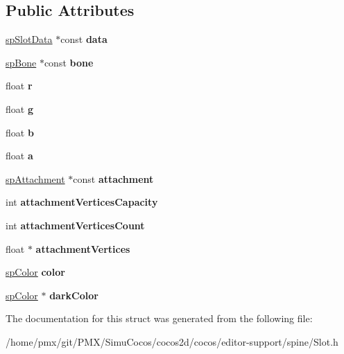 \subsection*{Public Attributes}
\begin{DoxyCompactItemize}
\item 
\mbox{\label{structspSlot_a535e1b2c5f0988647e600ce44c6211b9}} 
\hyperlink{structspSlotData}{sp\+Slot\+Data} $\ast$const {\bfseries data}
\item 
\mbox{\label{structspSlot_a215a15f5d2e0e6b8f91df8672afb0c2c}} 
\hyperlink{structspBone}{sp\+Bone} $\ast$const {\bfseries bone}
\item 
\mbox{\label{structspSlot_adf1bbeb82cf0c3834e3bc8c5fce1d698}} 
float {\bfseries r}
\item 
\mbox{\label{structspSlot_a80ec2bf7ada2d76407123c5ef0ac9dd4}} 
float {\bfseries g}
\item 
\mbox{\label{structspSlot_ab6b83663476fe2d9f7229b2036727960}} 
float {\bfseries b}
\item 
\mbox{\label{structspSlot_a5809a9fef07dc605ac2c2301167f7b0b}} 
float {\bfseries a}
\item 
\mbox{\label{structspSlot_a14e636bda0ea809807afeeb358b86213}} 
\hyperlink{structspAttachment}{sp\+Attachment} $\ast$const {\bfseries attachment}
\item 
\mbox{\label{structspSlot_a8885c0198f030d31723432fbabc73d28}} 
int {\bfseries attachment\+Vertices\+Capacity}
\item 
\mbox{\label{structspSlot_a8cf12728f84af0f3b7bcd07832293735}} 
int {\bfseries attachment\+Vertices\+Count}
\item 
\mbox{\label{structspSlot_afa891fb92218f35272148c7023dcf5f1}} 
float $\ast$ {\bfseries attachment\+Vertices}
\item 
\mbox{\label{structspSlot_a82bbdd431f0c08994e6311b3e9200701}} 
\hyperlink{structspColor}{sp\+Color} {\bfseries color}
\item 
\mbox{\label{structspSlot_a45b61655108944851e93ec34a4be2d01}} 
\hyperlink{structspColor}{sp\+Color} $\ast$ {\bfseries dark\+Color}
\end{DoxyCompactItemize}


The documentation for this struct was generated from the following file\+:\begin{DoxyCompactItemize}
\item 
/home/pmx/git/\+P\+M\+X/\+Simu\+Cocos/cocos2d/cocos/editor-\/support/spine/Slot.\+h\end{DoxyCompactItemize}
